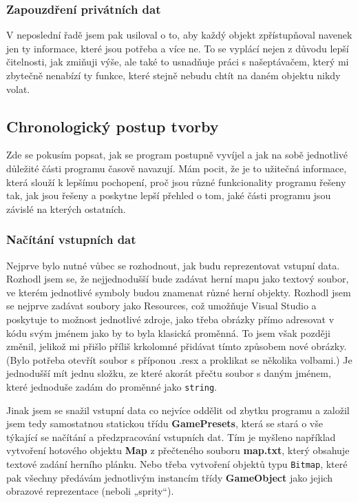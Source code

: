 \documentclass[a4]{article}
\begin{document}
\subsubsection{Zapouzdření privátních dat}
V neposlední řadě jsem pak usiloval o to, aby každý objekt zpřístupňoval navenek jen ty informace, které jsou potřeba a více ne. To se vyplácí nejen z důvodu lepší čitelnosti, jak zmiňuji výše, ale také to usnadňuje práci s našeptávačem, který mi zbytečně nenabízí ty funkce, které stejně nebudu chtít na daném objektu nikdy volat.

\subsection{Chronologický postup tvorby}
Zde se pokusím popsat, jak se program postupně vyvíjel a jak na sobě jednotlivé důležité části programu časově navazují. Mám pocit, že je to užitečná informace, která slouží k lepšímu pochopení, proč jsou různé funkcionality programu řešeny tak, jak jsou řešeny a poskytne lepší přehled o tom, jaké části programu jsou závislé na kterých ostatních.

\subsubsection{Načítání vstupních dat}
Nejprve bylo nutné vůbec se rozhodnout, jak budu reprezentovat vstupní data. Rozhodl jsem se, že nejjednodušší bude zadávat herní mapu jako textový soubor, ve kterém jednotlivé symboly budou znamenat různé herní objekty. Rozhodl jsem se nejprve zadávat soubory jako Resources, což umožňuje Visual Studio a poskytuje to možnost jednotlivé zdroje, jako třeba obrázky přímo adresovat v kódu svým jménem jako by to byla klasická proměnná. To jsem však později změnil, jelikož mi přišlo příliš krkolomné přidávat tímto způsobem nové obrázky. (Bylo potřeba otevřít soubor s příponou .resx a proklikat se několika volbami.) Je jednodušší mít jednu složku, ze které akorát přečtu soubor s daným jménem, které jednoduše zadám do proměnné jako \verb|string|.

Jinak jsem se snažil vstupní data co nejvíce oddělit od zbytku programu a založil jsem tedy samostatnou statickou třídu \textbf{GamePresets}, která se stará o vše týkající se načítání a předzpracování vstupních dat. Tím je myšleno například vytvoření hotového objektu \textbf{Map} z přečteného souboru \textbf{map.txt}, který obsahuje textové zadání herního plánku. Nebo třeba vytvoření objektů typu \verb|Bitmap|, které pak všechny předávám jednotlivým instancím třídy \textbf{GameObject} jako jejich obrazové reprezentace (neboli „sprity“).
\end{document}
